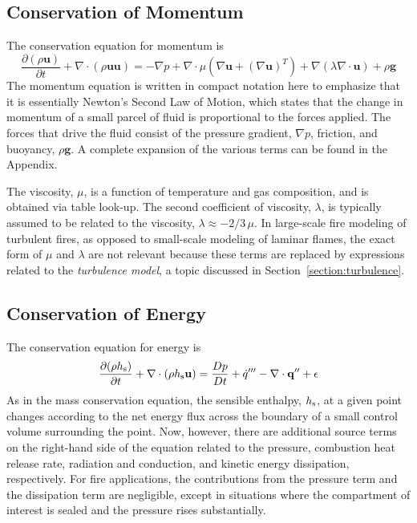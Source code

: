 \documentclass[graybox]{svmult}
\begin{document}
\subsection{Conservation of Momentum}

The conservation equation for momentum is
\begin{equation}
\frac{\partial (\rho \mathbf{u})}{\partial t} + \nabla \cdot (\rho \mathbf{u} \mathbf{u}) = -\nabla p + \nabla \cdot \mu \left( \nabla \mathbf{u} + (\nabla \mathbf{u})^T \right) +  \nabla (\lambda \nabla \cdot \mathbf{u}) + \rho \mathbf{g}
\label{eq:momcon}
\end{equation}
The momentum equation is written in compact notation here to emphasize that it is essentially Newton's Second Law of Motion, which states that the change in momentum of a small parcel of fluid is proportional to the forces applied. The forces that drive the fluid consist of the pressure gradient, $\nabla p$, friction, and buoyancy, $\rho \mathbf{g}$. A complete expansion of the various terms can be found in the Appendix.

The viscosity, $\mu$, is a function of temperature and gas composition, and is obtained via table look-up. The second coefficient of viscosity, $\lambda$, is typically assumed to be related to the viscosity, $\lambda \approx -2/3 \, \mu$. In large-scale fire modeling of turbulent fires, as opposed to small-scale modeling of laminar flames, the exact form of $\mu$ and $\lambda$ are not relevant because these terms are replaced by expressions related to the {\em turbulence model}, a topic discussed in Section~\ref{section:turbulence}.

\subsection{Conservation of Energy}

The conservation equation for energy is
\begin{equation}
\frac{\partial (\rho h_{\rm s})}{\partial t} + \nabla \cdot (\rho h_{\rm s} \mathbf{u}) = \frac{Dp}{Dt} + \dot{q}''' - \nabla \cdot \mathbf{q}'' + \epsilon
\label{eq:encon}
\end{equation}
As in the mass conservation equation, the sensible enthalpy, $h_{\rm s}$, at a given point changes according to the net energy flux across the boundary of a small control volume surrounding the point. Now, however, there are additional source terms on the right-hand side of the equation related to the pressure, combustion heat release rate, radiation and conduction, and kinetic energy dissipation, respectively. For fire applications, the contributions from the pressure term and the dissipation term are negligible, except in situations where the compartment of interest is sealed and the pressure rises substantially.
\end{document}
